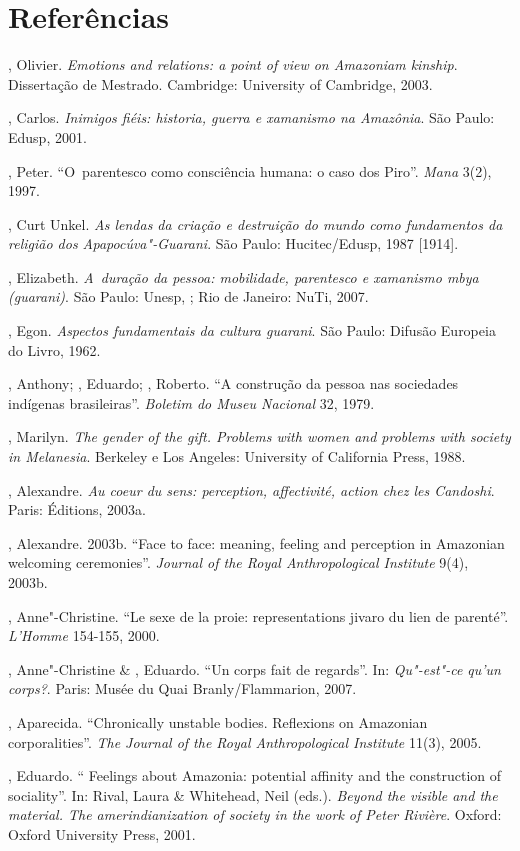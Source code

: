 \section{Referências}

\begin{Parskip}
, Olivier. \emph{Emotions and relations: a point of view on
Amazoniam kinship}. Dissertação de Mestrado. Cambridge: University of
Cambridge, 2003.

, Carlos. \emph{Inimigos fiéis: historia, guerra e xamanismo na
Amazônia}. São Paulo: Edusp, 2001.

, Peter. ``O~parentesco como consciência humana: o caso dos Piro''.
\emph{Mana} 3(2), 1997.

, Curt Unkel. \emph{As lendas da criação e destruição do mundo
como fundamentos da religião dos Apapocúva"-Guarani}. São Paulo:
Hucitec/Edusp, 1987 [1914].

, Elizabeth. \emph{A~duração da pessoa: mobilidade, parentesco
e xamanismo mbya (guarani)}. São Paulo: Unesp, ; Rio de Janeiro:
NuTi, 2007.

, Egon. \emph{Aspectos fundamentais da cultura guarani}. São
Paulo: Difusão Europeia do Livro, 1962.

, Anthony; , Eduardo;  , Roberto. ``A
construção da pessoa nas sociedades indígenas brasileiras''. \emph{Boletim do
Museu Nacional} 32, 1979.

, Marilyn. \emph{The gender of the gift. Problems with women
and problems with society in Melanesia}. Berkeley e Los Angeles:
University of California Press, 1988.

, Alexandre. \emph{Au coeur du sens: perception, affectivité,
action chez les Candoshi}. Paris:  Éditions, 2003a.

, Alexandre. 2003b. ``Face to face: meaning, feeling and
perception in Amazonian welcoming ceremonies''. \emph{Journal of the Royal
Anthropological Institute} 9(4), 2003b.

, Anne"-Christine. ``Le sexe de la proie: representations
jivaro du lien de parenté''. \emph{L’Homme} 154-155, 2000.

, Anne"-Christine \&   , Eduardo. ``Un corps
fait de regards''. In: \emph{Qu"-est"-ce qu’un corps?}. Paris: Musée du Quai
Branly/Flammarion, 2007.

, Aparecida. ``Chronically unstable bodies. Reflexions on
Amazonian corporalities''. \emph{The Journal of the Royal Anthropological
Institute} 11(3), 2005.

  , Eduardo. `` Feelings about Amazonia:
potential affinity and the construction of sociality''. In: Rival, Laura
\& Whitehead, Neil (eds.). \emph{Beyond the visible and the material. The
amerindianization of society in the work of Peter Rivière}. Oxford:
Oxford University Press, 2001.
\end{Parskip}

